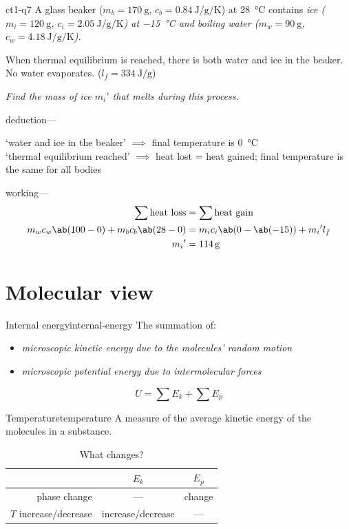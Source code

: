 \begin{example}{}{ct1-q7}
	A glass beaker (\(m_b = \qty{170}{\gram}\), \(c_b = \qty{0.84}{\joule\per\gram\per\kelvin}\))
	at \qty{28}{\celsius} contains \it{ice} (\(m_i = \qty{120}{\gram}\), \(c_i=\qty{2.05}{\joule\per\gram\per\kelvin}\))
	at \qty{-15}{\celsius} and boiling \it{water} (\(m_w = \qty{90}{\gram}\), \(c_w = \qty{4.18}{\joule\per\gram\per\kelvin}\)).

	When thermal equilibrium is reached, there is both water and ice in the beaker. No water evaporates.
	(\(l_f = \qty{334}{\joule\per\gram}\))

	\it{Find the mass of ice \({m_i}'\) that melts during this process.}
	\vspace*{5mm}

	deduction---
	\begin{center}
		`water and ice in the beaker' \(\implies\) final temperature is \qty{0}{\celsius} \\
		`thermal equilibrium reached' \(\implies\) heat lost = heat gained; final temperature is the same for all bodies
	\end{center}
	\vspace*{5mm}

	working---
	\begin{align*}
		\sum\text{heat loss}                  & = \sum\text{heat gain}                \\
		m_w c_w\ab(100-0)  + m_b c_b\ab(28-0) & = m_i c_i\ab(0-\ab(-15)) + {m_i}' l_f \\
		{m_i}'                                & = \qty{114}{\gram}
	\end{align*}
\end{example}

\section{Molecular view}
\begin{definition}{Internal energy}{internal-energy}
	The summation of:
	\begin{itemize}
		\item \it{microscopic kinetic energy} due to the molecules' random motion
		\item \it{microscopic potential energy} due to intermolecular forces
	\end{itemize}
	\[U = \sum E_k + \sum E_p\]
\end{definition}
\begin{definition}{Temperature}{temperature}
	A measure of the average kinetic energy of the molecules in a substance.
\end{definition}
\begin{table}[htpb]
	\centering
	\begin{tabular}{r c c}
		\toprule
		                        & \(E_k\)           & \(E_p\) \\
		\midrule
		phase change            & ---               & change  \\
		\(T\) increase/decrease & increase/decrease & ---     \\
		\bottomrule
	\end{tabular}
	\label{tab:ek-ep}
	\caption{What changes?}
\end{table}

